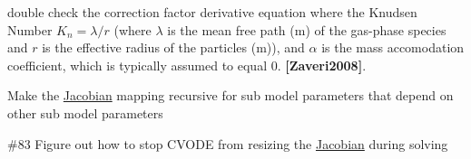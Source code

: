 
\begin{DoxyRefList}
\item[Member \mbox{\hyperlink{util_8h_af0918da54a73bf30e7079908caea2efd}{d\+\_\+transition\+\_\+regime\+\_\+correction\+\_\+factor\+\_\+d\+\_\+radius}} (double mean\+\_\+free\+\_\+path\+\_\+\+\_\+m, double radius\+\_\+\+\_\+m, double alpha)]\label{todo__todo000003}%
%
double check the correction factor derivative equation where the Knudsen Number $K_n = \lambda / r$ (where $\lambda$ is the mean free path (m) of the gas-\/phase species and $r$ is the effective radius of the particles (m)), and $ \alpha $ is the mass accomodation coefficient, which is typically assumed to equal 0. {\bfseries [Zaveri2008]}. 
\item[Member \mbox{\hyperlink{camp__solver_8h_a5b485fa25356197023889f3795888e98}{get\+\_\+jac\+\_\+init}} (\mbox{\hyperlink{struct_solver_data}{Solver\+Data}} $\ast$solver\+\_\+data)]\label{todo__todo000002}%
%
Make the \mbox{\hyperlink{struct_jacobian}{Jacobian}} mapping recursive for sub model parameters that depend on other sub model parameters  
\item[Member \mbox{\hyperlink{camp__solver_8h_a78e694c3221a39e0b96a5f40fa0fc0dd}{Jac}} (realtype t, N\+\_\+\+Vector y, N\+\_\+\+Vector deriv, SUNMatrix J, void $\ast$model\+\_\+data, N\+\_\+\+Vector tmp1, N\+\_\+\+Vector tmp2, N\+\_\+\+Vector tmp3)]\label{todo__todo000001}%
%
\#83 Figure out how to stop CVODE from resizing the \mbox{\hyperlink{struct_jacobian}{Jacobian}} during solving 
\end{DoxyRefList}